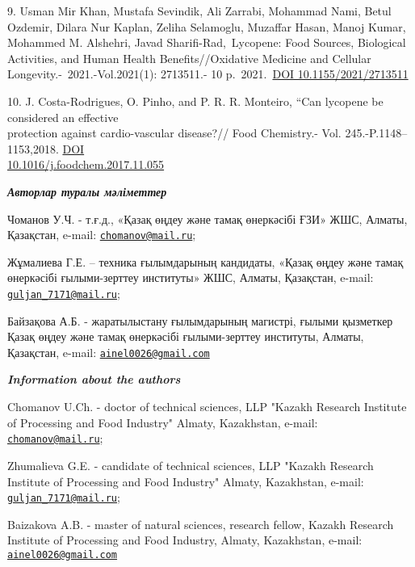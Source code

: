 \begin{references}
9. Usman Mir Khan, Mustafa Sevindik, Ali Zarrabi, Mohammad Nami, Betul
Ozdemir, Dilara Nur Kaplan, Zeliha Selamoglu, Muzaffar Hasan, Manoj
Kumar, Mohammed M. Alshehri, Javad Sharifi-Rad,~Lycopene: Food Sources,
Biological Activities, and Human Health Benefits//Oxidative Medicine and
Cellular \\Longevity.-~2021.-Vol.2021(1): 2713511.- 10
p.~2021.~\href{https://doi.org/10.1155/2021/2713511}{DOI
10.1155/2021/2713511}

10. J. Costa-Rodrigues, O. Pinho, and P. R. R. Monteiro, ``Can lycopene
be considered an eﬀective \\protection against cardio-vascular disease?//
Food Chemistry.- Vol. 245.-P.1148--1153,2018.
\href{https://doi.org/10.1155/2021/2713511}{DOI\\
10.1016/j.foodchem.2017.11.055}
\end{references}

\begin{authorinfo}
\emph{{\bfseries Авторлар туралы мәліметтер}}

Чоманов У.Ч. - т.ғ.д., «Қазақ өңдеу және тамақ өнеркәсібі ҒЗИ» ЖШС,
Алматы, Қазақстан, e-mail:
\href{mailto:сhomanov@mail.ru}{\nolinkurl{сhomanov@mail.ru}};

Жұмалиева Г.Е. -- техника ғылымдарының кандидаты, «Қазақ өңдеу және
тамақ өнеркәсібі ғылыми-зерттеу институты» ЖШС, Алматы, Қазақстан,
e-mail:
\href{mailto:guljan_7171@mail.ru}{\nolinkurl{guljan\_7171@mail.ru}};

Байзақова А.Б. - жаратылыстану ғылымдарының магистрі, ғылыми қызметкер
Қазақ өңдеу және тамақ өнеркәсібі ғылыми-зерттеу институты, Алматы,
Қазақстан, e-mail:
\href{mailto:ainel0026@gmail.com}{\nolinkurl{ainel0026@gmail.com}}

\emph{{\bfseries Information about the authors}}

Chomanov U.Ch. - doctor of technical sciences, LLP "Kazakh Research
Institute of Processing and Food Industry" Almaty, Kazakhstan, e-mail:
\href{mailto:сhomanov@mail.ru}{\nolinkurl{сhomanov@mail.ru}};

Zhumalieva G.E. - candidate of technical sciences, LLP "Kazakh Research
Institute of Processing and Food Industry" Almaty, Kazakhstan, e-mail:
\href{mailto:guljan_7171@mail.ru}{\nolinkurl{guljan\_7171@mail.ru}};

Baizakova A.B. - master of natural sciences, research fellow, Kazakh
Research Institute of Processing and Food Industry, Almaty, Kazakhstan,
e-mail:
\href{mailto:ainel0026@gmail.com}{\nolinkurl{ainel0026@gmail.com}}
\end{authorinfo}
